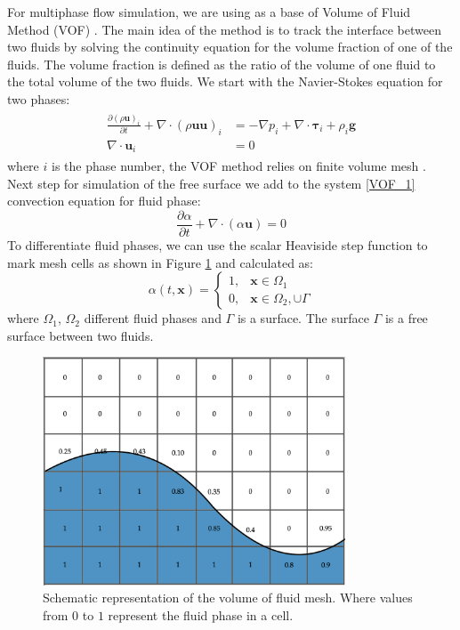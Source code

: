 For multiphase flow simulation, we are using as a base of Volume of Fluid Method (VOF) \cite{hirt1981vof}. The main idea of the method is to track the interface between two fluids by solving the continuity equation for the volume fraction of one of the fluids. The volume fraction is defined as the ratio of the volume of one fluid to the total volume of the two fluids.
We start with the Navier-Stokes equation for two phases:
\begin{equation}\label{VOF_1}
\begin{array}{c}
\begin{aligned}
\frac{\partial(\rho \mathbf{u})_{i}}{\partial t}+\nabla \cdot(\rho \mathbf{u u})_{i} & = -\nabla p_{i}+\nabla \cdot \boldsymbol{\tau}_{i}+\rho_{i} \mathbf{g} \\
\nabla \cdot \mathbf{u}_{i} &= 0
\end{aligned}
\end{array}
\end{equation}
where $i$ is the phase number, the VOF method relies on finite volume mesh \cite{ferziger2002cfd}. Next step for simulation of the free surface we add to the system \ref{VOF_1} convection equation for fluid phase:
\begin{equation}
\frac{\partial \alpha}{\partial t}+\nabla \cdot(\alpha \mathbf{u})=0
\end{equation}
To differentiate fluid phases, we can use the scalar Heaviside step function to mark mesh cells as shown in Figure \ref{fig:VOF_free_surface} and calculated as:
\begin{equation}\label{2.1}
\alpha(t, \mathbf{x})=\left\{\begin{array}{ll}
1, & \mathbf{x} \in \Omega_{1} \\
0, & \mathbf{x} \in \Omega_{2}, \cup \Gamma
\end{array}\right.
\end{equation}
where $\Omega_{1}$, $\Omega_{2}$ different fluid phases and $\Gamma$ is a surface. The surface $\Gamma$ is a free surface between two fluids.
\begin{figure}[H]
    \centering
    \includegraphics[width=9cm]{Images/VOF_free_surface.png}
    \caption{Schematic representation of the volume of fluid mesh. Where values from $0$ to $1$ represent the fluid phase in a cell.}
    \label{fig:VOF_free_surface}
\end{figure}
